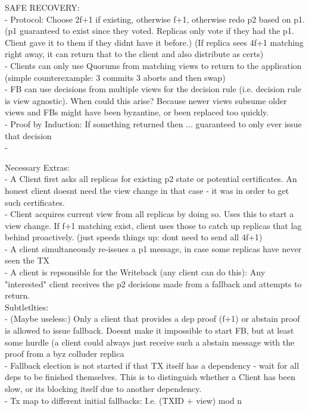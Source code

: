 SAFE RECOVERY:\\
- Protocol: Choose 2f+1 if existing, otherwise f+1, otherwise redo p2 based on p1. (p1 guaranteed to exist since they voted. Replicas only vote if they had the p1. Client gave it to them if they didnt have it before.) (If replica sees 4f+1 matching right away, it can return that to the client and also distribute as certs)\\
- Clients can only use Quorums from matching views to return to the application (simple counterexample: 3 commits 3 aborts and then swap)\\
- FB can use decisions from multiple views for the decision rule (i.e. decision rule is view agnostic). When could this arise? Because newer views subsume older views and FBs might have been byzantine, or been replaced too quickly. \\
- Proof by Induction: If something returned then ... guaranteed to only ever issue that decision\\
- 



Necessary Extras:\\
- A Client first asks all replicas for existing p2 state or potential certificates. An honest client doesnt need the view change in that case - it was in order to get such certificates.\\
- Client acquires current view from all replicas by doing so. Uses this to start a view change. If f+1 matching exist, client uses those to catch up replicas that lag behind proactively. (just speeds things up: dont need to send all 4f+1)\\
- A client simultaneously re-issues a p1 message, in case some replicas have never seen the TX\\
- A client is repsonsible for the Writeback (any client can do this): Any "interested" client receives the p2 decisions made from a fallback and attempts to return. \\


Subtletlties:\\
- (Maybe useless:) Only a client that provides a dep proof (f+1) or abstain proof is allowed to issue fallback. Doesnt make it impossible to start FB, but at least some hurdle (a client could always just receive such a abstain message with the proof from a byz colluder replica\\
- Fallback election is not started if that TX itself has a dependency - wait for all deps to be finished themselves. This is to distinguish whether a Client has been slow, or its blocking itself due to another dependency.\\
- Tx map to different initial fallbacks: I.e. (TXID + view) mod n \\


